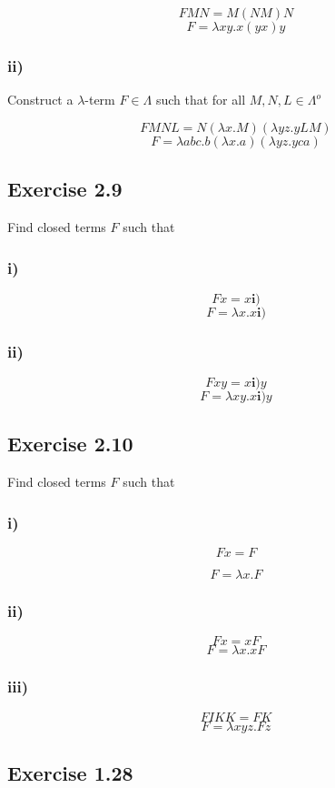 \documentclass[11pt]{article}
\begin{document}
 
\[
FMN = M(NM)N
\]
\[
F = \lambda xy. x(yx)y
\]

\subsubsection*{ii)}
Construct a $\lambda$-term $F \in \Lambda$ such that for all $M, N, L \in \Lambda ^o$

\[
FMNL = N(\lambda x.M)(\lambda yz.yLM)
\]
\[
F = \lambda abc. b(\lambda x.a) (\lambda yz.yca)
\]


\subsection*{Exercise 2.9}
Find closed terms $F$ such that
\subsubsection*{i)}

\[
Fx = x \mathbf{i)}
\]
\[
F = \lambda x. x \mathbf{i)}
\]

\subsubsection*{ii)}
\[
F xy = x \mathbf{i)} y
\]
\[
F = \lambda xy. x \mathbf{i)} y
\]


\subsection*{Exercise 2.10}
Find closed terms $F$ such that

\subsubsection*{i)}
\[
F x = F
\]

\[
F = \lambda x. F
\]


\subsubsection*{ii)}
\[
F x = x F
\]
\[
F = \lambda x. xF
\]

\subsubsection*{iii)}
\[
FIKK = FK
\]
\[
F = \lambda xyz.Fz
\]


\subsection*{Exercise 1.28}
\end{document}
